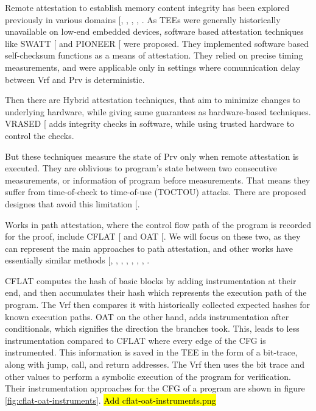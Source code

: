 \documentclass[a4paper, nobind]{templates/ociamthesis}
\begin{document}
Remote attestation to establish memory content integrity has been explored previously
in various domains {[}, , , , \citeproc{ref-sun2020oat}{53}{]}.
As TEEs were generally historically unavailable on low-end embedded devices,
software based attestation techniques like SWATT {[}\citeproc{ref-seshadri2004swatt}{50}{]} and
PIONEER {[}\citeproc{ref-seshadri2005pioneer}{49}{]} were proposed.
They implemented software based self-checksum functions as a means of attestation.
They relied on precise timing measurements, and were applicable only in settings where
comunnication delay between Vrf and Prv is deterministic.

Then there are Hybrid attestation techniques, that aim to minimize changes to
underlying hardware, while giving same guarantees as hardware-based techniques.
VRASED {[}\citeproc{ref-nunes2019vrased}{42}{]} adds integrity checks in software, while using trusted hardware to control the checks.

But these techniques measure the state of Prv only when remote attestation is executed.
They are oblivious to program's state between two consecutive measurements, or
information of program before measurements. That means they suffer from
time-of-check to time-of-use (TOCTOU) attacks. There are proposed designes that
avoid this limitation {[}\citeproc{ref-de2021toctou}{24}{]}.

Works in path attestation, where the control flow path of the program is recorded
for the proof, include CFLAT {[}\citeproc{ref-abera2016cflat}{2}{]} and OAT {[}\citeproc{ref-sun2020oat}{53}{]}.
We will focus on these two, as they can represent the main approaches to path
attestation, and other works have essentially similar methods {[}, , , , , , , \citeproc{ref-zhang2021recfa}{58}{]}.

CFLAT computes the hash of basic blocks by adding instrumentation at their end,
and then accumulates their hash which represents the execution path of the program.
The Vrf then compares it with historically collected expected hashes for known
execution paths.
OAT on the other hand, adds instrumentation after conditionals, which signifies
the direction the branches took. This, leads to less instrumentation compared to
CFLAT where every edge of the CFG is instrumented.
This information is saved in the TEE in the form of a bit-trace, along with
jump, call, and return addresses.
The Vrf then uses the bit trace and other values to perform a symbolic execution
of the program for verification.
Their instrumentation approaches for the CFG of a program
are shown in figure \ref{fig:cflat-oat-instruments}.
\hl{Add cflat-oat-instruments.png}
\end{document}
